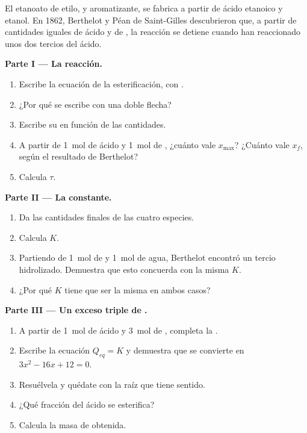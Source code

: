 \begin{problem}
\label{pb:g12:equilibrium:1}
El etanoato de etilo,  y aromatizante, se fabrica a partir de
ácido etanoico y etanol. En 1862, Berthelot y Péan de Saint-Gilles
descubrieron que, a partir de cantidades iguales de ácido y de ,
la reacción se detiene cuando han reaccionado unos dos tercios del
ácido.

\medskip
\noindent\textbf{Parte I --- La reacción.}
\begin{enumerate}
  \item Escribe la ecuación de la esterificación, con .
  \item ¿Por qué se escribe con una doble flecha?
  \item Escribe su  en función de las cantidades.
  \item A partir de \qty{1}{mol} de ácido y \qty{1}{mol} de ,
        ¿cuánto vale $x_{\max}$? ¿Cuánto vale $x_f$, según el resultado de
        Berthelot?
  \item Calcula $\tau$.
\end{enumerate}

\medskip
\noindent\textbf{Parte II --- La constante.}
\begin{enumerate}[resume]
  \item Da las cantidades finales de las cuatro especies.
  \item Calcula $K$.
  \item Partiendo de \qty{1}{mol} de  y \qty{1}{mol} de agua,
        Berthelot encontró un tercio hidrolizado. Demuestra que esto
        concuerda con la misma $K$.
  \item ¿Por qué $K$ tiene que ser la misma en ambos casos?
\end{enumerate}

\medskip
\noindent\textbf{Parte III --- Un exceso triple de .}
\begin{enumerate}[resume]
  \item A partir de \qty{1}{mol} de ácido y \qty{3}{mol} de ,
        completa la .
  \item Escribe la ecuación $Q_{eq} = K$ y demuestra que se convierte en
        $3x^2 - 16x + 12 = 0$.
  \item Resuélvela y quédate con la raíz que tiene sentido.
  \item ¿Qué fracción del ácido se esterifica?
  \item Calcula la masa de  obtenida.
\end{enumerate}


\end{problem}
